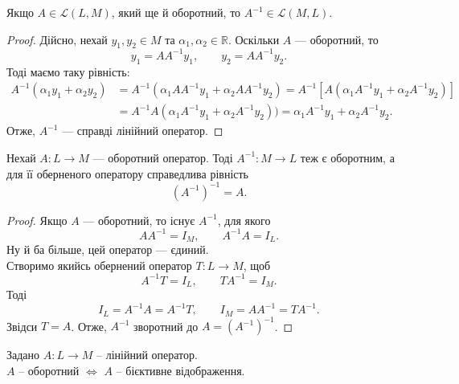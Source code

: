 \documentclass{math_library}
\begin{document}
	\begin{proposition}
	Якщо $A \in \mathcal{L}(L,M)$, який ще й оборотний, то $A^{-1} \in \mathcal{L}(M,L)$.
	\end{proposition}
	
	\begin{proof}
	Дійсно, нехай $y_1,y_2 \in M$ та $\alpha_1,\alpha_2 \in \mathbb{R}$. Оскільки $A$ --- оборотний, то
	\[
	y_1 = AA^{-1}y_1, \qquad y_2 = AA^{-1}y_2.
	\]
	Тоді маємо таку рівність:
	\begin{align*}
	A^{-1}(\alpha_1 y_1 + \alpha_2 y_2) & = A^{-1}(\alpha_1 AA^{-1}y_1 + \alpha_2 AA^{-1}y_2) = A^{-1}[A(\alpha_1 A^{-1}y_1 + \alpha_2 A^{-1}y_2)] \\ 
	& = A^{-1}A(\alpha_1 A^{-1}y_1 + \alpha_2 A^{-1}y_2)) = \alpha_1 A^{-1}y_1 + \alpha_2 A^{-1}y_2.
	\end{align*}
	Отже, $A^{-1}$ --- справді лінійний оператор.
	\end{proof}
	
	\begin{proposition}
	Нехай $A \colon L \to M$ --- оборотний оператор. Тоді $A^{-1} \colon M \to L$ теж є оборотним, а для її оберненого оператору справедлива рівність 
	\[
	(A^{-1})^{-1} = A.
	\]
	\end{proposition}
	
	\begin{proof}
	Якщо $A$ --- оборотний, то існує $A^{-1}$, для якого
	\[
	 AA^{-1} = I_M, \qquad A^{-1}A = I_L.
	\]
	 Ну й ба більше, цей оператор --- єдиний.\\
	Створимо якийсь обернений оператор $T \colon L \to M$, щоб 
	\[
	A^{-1}T = I_L, \qquad TA^{-1} = I_M.
	\]
	Тоді 
	\[
	I_L = A^{-1}A = A^{-1}T,\qquad I_M = AA^{-1} = TA^{-1}.
	\]
	Звідси $T = A$. Отже, $A^{-1}$ зворотний до $A = (A^{-1})^{-1}$.
	\end{proof}

\iffalse
	\begin{lemma}
	\label{invertibility_criterion}
	Задано $A \colon L \to M$ -- лінійний оператор.\\
	$A$ -- оборотний $\iff$ $A$ -- бієктивне відображення.
	\end{lemma}
	
\end{document}
